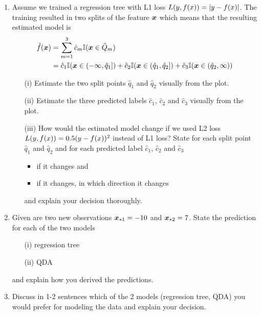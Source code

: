 \documentclass[a4paper]{article}
\begin{document}
{\begin{enumerate}
  \item Assume we trained a regression tree with L1 loss $L(y, f(x)) = |y-f(x)|$. 
  The training resulted in two splits of the feature $\bm{x}$ which means that the 
  resulting estimated model is 
  \begin{align*}
  \hat{f} (\bm{x}) &= \sum_{m=1}^3 \hat{c}_m \mathbb{I}(\bm{x} \in \hat{Q}_m)\\
   &= \hat{c}_1 \mathbb{I}(\bm{x} \in (-\infty, \hat{q}_1]) + 
   \hat{c}_2 \mathbb{I}(\bm{x} \in (\hat{q}_1, \hat{q}_2]) +
   \hat{c}_3 \mathbb{I}(\bm{x} \in (\hat{q}_2, \infty))
  \end{align*}
  \begin{enumerate}
    \item[(i)] Estimate the two split points $\hat{q}_1$ and $\hat{q}_2$ 
    visually from the plot.
    \item[(ii)] Estimate the three predicted labels $\hat{c}_1$, 
    $\hat{c}_2$ and $\hat{c}_3$ visually from the plot.
    \item[(iii)] How would the estimated model change if we used L2 loss \\ 
    $L(y, f(x)) = 0.5 (y-f(x))^2$ instead of L1 loss? State for each split point 
    $\hat{q}_1$ and $\hat{q}_2$ and for each predicted label $\hat{c}_1$, 
    $\hat{c}_2$ and $\hat{c}_3$ 
    \begin{itemize}
      \item if it changes and
      \item if it changes, in which direction it changes
    \end{itemize}
      and explain your decision thoroughly.
  \end{enumerate}
  \item Given are two new observations $\bm{x}_{*1} = -10$ and $\bm{x}_{*2} = 7$. 
  State the prediction for each of the two models 
  \begin{enumerate}
    \item[(i)] regression tree
    \item[(ii)] QDA
  \end{enumerate}
  and explain how you derived the predictions.
  \item Discuss in 1-2 sentences which of the 2 models (regression tree, QDA) 
  you would prefer for modeling the data and explain your decision.
\end{enumerate}
}
\end{document}
